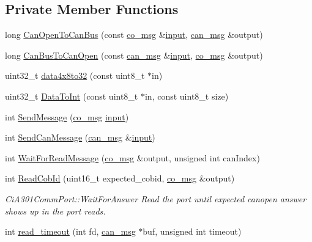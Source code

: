 \subsection*{Private Member Functions}
\begin{DoxyCompactItemize}
\item 
long \hyperlink{classCiA301CommPort_a26346f83700bc8403a315be01c6508e0}{Can\+Open\+To\+Can\+Bus} (const \hyperlink{structco__msg}{co\+\_\+msg} \&\hyperlink{classCiA301CommPort_ae0f955c7141e2067307cea0b48e111d4}{input}, \hyperlink{structcan__msg}{can\+\_\+msg} \&output)
\item 
long \hyperlink{classCiA301CommPort_aa16887712ea9cad534aacd4851f9190d}{Can\+Bus\+To\+Can\+Open} (const \hyperlink{structcan__msg}{can\+\_\+msg} \&\hyperlink{classCiA301CommPort_ae0f955c7141e2067307cea0b48e111d4}{input}, \hyperlink{structco__msg}{co\+\_\+msg} \&output)
\item 
uint32\+\_\+t \hyperlink{classCiA301CommPort_a77ec43d792a81489e221c3990225e57b}{data4x8to32} (const uint8\+\_\+t $\ast$in)
\item 
uint32\+\_\+t \hyperlink{classCiA301CommPort_a2bbd06fc6ae74727cef148911e433495}{Data\+To\+Int} (const uint8\+\_\+t $\ast$in, const uint8\+\_\+t size)
\item 
int \hyperlink{classCiA301CommPort_aeae04455e1e1a1ca1beed9478372c031}{Send\+Message} (\hyperlink{structco__msg}{co\+\_\+msg} \hyperlink{classCiA301CommPort_ae0f955c7141e2067307cea0b48e111d4}{input})
\item 
int \hyperlink{classCiA301CommPort_a700a04da67928ca50744617ece28cde5}{Send\+Can\+Message} (\hyperlink{structcan__msg}{can\+\_\+msg} \&\hyperlink{classCiA301CommPort_ae0f955c7141e2067307cea0b48e111d4}{input})
\item 
int \hyperlink{classCiA301CommPort_a02ba7069a0497e3497f3dfaec2879b54}{Wait\+For\+Read\+Message} (\hyperlink{structco__msg}{co\+\_\+msg} \&output, unsigned int can\+Index)
\item 
int \hyperlink{classCiA301CommPort_a408f53d13935a1916ca6f21d08ae135e}{Read\+Cob\+Id} (uint16\+\_\+t expected\+\_\+cobid, \hyperlink{structco__msg}{co\+\_\+msg} \&output)
\begin{DoxyCompactList}\small\item\em Ci\+A301\+Comm\+Port\+::\+Wait\+For\+Answer Read the port until expected canopen answer shows up in the port reads. \end{DoxyCompactList}\item 
int \hyperlink{classCiA301CommPort_ae62c2389b38a0e217aff7ca17a3d87b6}{read\+\_\+timeout} (int fd, \hyperlink{structcan__msg}{can\+\_\+msg} $\ast$buf, unsigned int timeout)

\end{DoxyCompactItemize}
